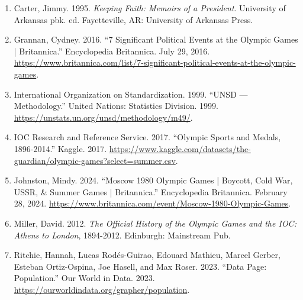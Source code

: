 \documentclass[fontsize=11pt]{article}
\begin{document}
\begin{enumerate}
    \item Carter, Jimmy. 1995. \textit{Keeping Faith: Memoirs of a President}. University of Arkansas pbk. ed. Fayetteville, AR: University of Arkansas Press.
    \item Grannan, Cydney. 2016. “7 Significant Political Events at the Olympic Games | Britannica.” Encyclopedia Britannica. July 29, 2016.  \url{https://www.britannica.com/list/7-significant-political-events-at-the-olympic-games}.
    \item International Organization on Standardization. 1999. “UNSD — Methodology.” United Nations: Statistics Division. 1999. \url{https://unstats.un.org/unsd/methodology/m49/}.
    \item IOC Research and Reference Service. 2017. “Olympic Sports and Medals, 1896-2014.” Kaggle. 2017. \url{https://www.kaggle.com/datasets/the-guardian/olympic-games?select=summer.csv}.
    \item Johnston, Mindy. 2024. “Moscow 1980 Olympic Games | Boycott, Cold War, USSR, \& Summer Games | Britannica.” Encyclopedia Britannica. February 28, 2024. \url{https://www.britannica.com/event/Moscow-1980-Olympic-Games}.
    \item Miller, David. 2012. \textit{The Official History of the Olympic Games and the IOC: Athens to London}, 1894-2012. Edinburgh: Mainstream Pub.
    \item Ritchie, Hannah, Lucas Rodés-Guirao, Edouard Mathieu, Marcel Gerber, Esteban Ortiz-Ospina, Joe Hasell, and Max Roser. 2023. “Data Page: Population.” Our World in Data. 2023. \url{https://ourworldindata.org/grapher/population}.
\end{enumerate}
\end{document}
